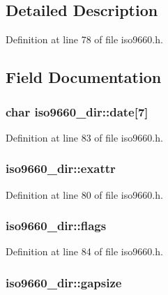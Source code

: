 \subsection{Detailed Description}


Definition at line 78 of file iso9660.\+h.



\subsection{Field Documentation}
\hypertarget{structiso9660__dir_ad1a0e3827108b5d4583e46056c98f302}{
\subsubsection[{date}]{\setlength{\rightskip}{0pt plus 5cm}char iso9660\+\_\+dir\+::date\mbox{[}7\mbox{]}}}\label{structiso9660__dir_ad1a0e3827108b5d4583e46056c98f302}


Definition at line 83 of file iso9660.\+h.

\hypertarget{structiso9660__dir_a9d379f70dbe8ddf0ad21cbb4d9269f4a}{
\subsubsection[{exattr}]{ iso9660\+\_\+dir\+::exattr}}\label{structiso9660__dir_a9d379f70dbe8ddf0ad21cbb4d9269f4a}


Definition at line 80 of file iso9660.\+h.

\hypertarget{structiso9660__dir_ab226f852b18e2b9dcddf013e3da07742}{
\subsubsection[{flags}]{ iso9660\+\_\+dir\+::flags}}\label{structiso9660__dir_ab226f852b18e2b9dcddf013e3da07742}


Definition at line 84 of file iso9660.\+h.

\hypertarget{structiso9660__dir_a358fa7ee0501266c9006e7b037027ee6}{
\subsubsection[{gapsize}]{ iso9660\+\_\+dir\+::gapsize}}\label{structiso9660__dir_a358fa7ee0501266c9006e7b037027ee6}


